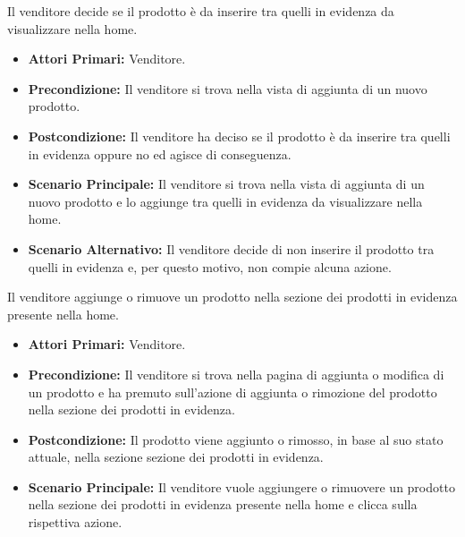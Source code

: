 Il venditore decide se il prodotto è da inserire tra quelli in evidenza da visualizzare nella home.
\begin{itemize}
    \item \textbf{Attori Primari:} Venditore.
    \item \textbf{Precondizione:} Il venditore si trova nella vista di aggiunta di un nuovo prodotto.
    \item \textbf{Postcondizione:} Il venditore ha deciso se il prodotto è da inserire tra quelli in evidenza oppure no ed agisce di conseguenza.
    \item \textbf{Scenario Principale:} Il venditore si trova nella vista di aggiunta di un nuovo prodotto e lo aggiunge tra quelli in evidenza da visualizzare nella home.
    \item \textbf{Scenario Alternativo:} Il venditore decide di non inserire il prodotto tra quelli in evidenza e, per questo motivo, non compie alcuna azione.
\end{itemize}


Il venditore aggiunge o rimuove un prodotto nella sezione dei prodotti in evidenza presente nella home.
\begin{itemize}
    \item \textbf{Attori Primari:} Venditore.
    \item \textbf{Precondizione:} Il venditore si trova nella pagina di aggiunta o modifica di un prodotto e ha premuto sull'azione di aggiunta o rimozione del prodotto nella sezione dei prodotti in evidenza.
    \item \textbf{Postcondizione:} Il prodotto viene aggiunto o rimosso, in base al suo stato attuale, nella sezione sezione dei prodotti in evidenza. 
    \item \textbf{Scenario Principale:} Il venditore vuole aggiungere o rimuovere un prodotto nella sezione dei prodotti in evidenza presente nella home e clicca sulla rispettiva azione.
\end{itemize}


